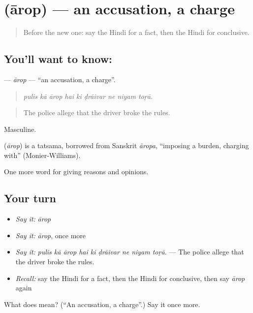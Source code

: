 \section[\texorpdfstring{\hi{आरोप} (ārop)}{आरोप (ārop)}]{ (ārop) — an accusation, a charge}

\label{lesson:HI-C348-arop}



\begin{quote}
Before the new one: say the Hindi for a fact, then the Hindi for conclusive.
\end{quote}

\subsection*{You'll want to know: }
\textbf{} — \emph{ārop} — \textquotedblleft{}an accusation, a charge\textquotedblright{}.

\begin{quote}
        
\end{quote}

\begin{quote}
\emph{pulis kā ārop hai ki ḍrāivar ne niyam toṛā.}
\end{quote}

\begin{quote}
The police allege that the driver broke the rules.
\end{quote}

Masculine.

\begin{cousinweb}
\textbf{} (\emph{ārop}) is a tatsama, borrowed from Sanskrit \emph{āropa}, \textquotedblleft{}imposing a burden, charging with\textquotedblright{} (Monier-Williams).
\end{cousinweb}

\begin{grammarlens}[title={What you've built}]
One more word for giving reasons and opinions.
\end{grammarlens}

\subsection*{Your turn}
\begin{itemize}
\raggedright
  \item \emph{Say it:} \emph{ārop}
  \item \emph{Say it:} \emph{ārop}, once more
  \item \emph{Say it:} \emph{pulis kā ārop hai ki ḍrāivar ne niyam toṛā.} — The police allege that the driver broke the rules.
  \item \emph{Recall:} say the Hindi for a fact, then the Hindi for conclusive, then say \emph{ārop} again
\end{itemize}

\begin{tcolorbox}[breakable,colback=teal!4,colframe=teal!35!black,title={Before you move on}]
What does  mean? (\textquotedblleft{}An accusation, a charge\textquotedblright{}.) Say it once more.
\end{tcolorbox}
